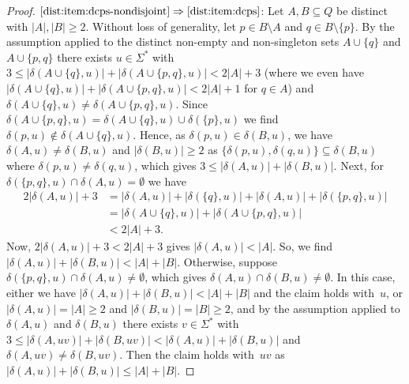\begin{proof}
	$\ref{dist:item:dcps-nondisjoint} \Rightarrow \ref{dist:item:dcps}$: Let $A, B \subseteq Q$ be distinct with $|A|, |B| \ge 2$. Without loss of generality, let $p \in B \setminus A$ and $q \in B \setminus\{p\}$. By the assumption applied to the distinct non-empty and non-singleton sets $A \cup \{q\}$ and $A \cup \{p,q\}$ there exists $u \in \Sigma^*$ with $3 \le |\delta(A \cup \{q\}, u)| + |\delta(A \cup \{p, q\}, u)| < 2|A|+3$ (where we even have 
	$|\delta(A \cup \{q\}, u)| + |\delta(A \cup \{p, q\}, u)| < 2|A| + 1$ for $q \in A$) and $\delta(A \cup \{q\}, u) \ne \delta(A \cup \{p, q\}, u)$. Since $\delta(A \cup \{p, q\}, u) = \delta(A \cup \{q\}, u) \cup \delta(\{p\}, u)$ we find $\delta(p, u) \notin \delta(A \cup \{q\}, u)$.
	Hence, as $\delta(p, u) \in \delta(B, u)$, we have $\delta(A, u) \ne \delta(B, u)$ 
	and $|\delta(B, u)| \ge 2$ as $\{\delta(p,u), \delta(q, u)\} \subseteq \delta(B, u)$
	where $\delta(p, u) \ne \delta(q, u)$,	
	which gives $3 \le |\delta(A, u)| + |\delta(B, u)|$. Next, for $\delta(\{p,q\}, u) \cap \delta(A, u) = \emptyset$ we have 
	\begin{align*}
		2|\delta(A, u)| + 3 & = |\delta(A, u)| + |\delta(\{q\}, u)| + |\delta(A, u)| + |\delta(\{p,q\}, u)| \\
		& = |\delta(A \cup \{q\}, u)| + |\delta(A \cup \{p, q\}, u)| \\
		& < 2|A| + 3.
	\end{align*}
	Now, $2|\delta(A, u)| + 3 < 2|A| + 3$ gives $|\delta(A, u)| < |A|$. So, we find $|\delta(A, u)| + |\delta(B, u)| < |A| + |B|$. Otherwise, suppose $\delta(\{p,q\}, u) \cap \delta(A, u) \ne \emptyset$, which gives $\delta(A, u) \cap \delta(B, u) \ne \emptyset$. In this case, either we have $|\delta(A, u)| + |\delta(B, u)| < |A| + |B|$ and the claim holds with~$u$, or $|\delta(A, u)| = |A| \ge 2$ and $|\delta(B, u)| = |B| \ge 2$, and by the assumption applied to $\delta(A, u)$ and $\delta(B, u)$ there exists $v \in \Sigma^*$ with $3 \le |\delta(A, uv)| + |\delta(B, uv)| < |\delta(A, u)| + |\delta(B, u)|$ and $\delta(A, uv) \ne \delta(B, uv)$. Then the claim holds with~$uv$ as $|\delta(A, u)| + |\delta(B, u)| \le |A| + |B|$.
	

\end{proof}
